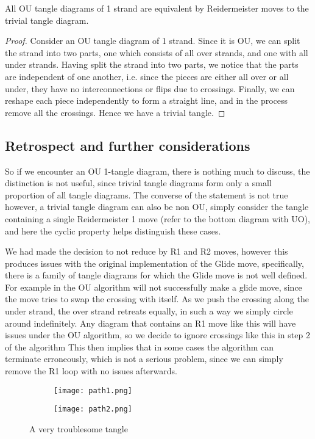 \begin{theorem}
All OU tangle diagrams of 1 strand are equivalent by Reidermeister moves to the trivial tangle diagram.
\end{theorem}

\begin{proof}
Consider an OU tangle diagram of 1 strand. Since it is OU, we can split the strand into two parts, one which consists of all over strands, and one with all under strands. Having split the strand into two parts, we notice that the parts are independent of one another, i.e. since the pieces are either all over or all under, they have no interconnections or flips due to crossings. Finally, we can reshape each piece independently to form a straight line, and in the process remove all the crossings. Hence we have a trivial tangle.
\end{proof}

\subsection{Retrospect and further considerations}

So if we encounter an OU 1-tangle diagram, there is nothing much to discuss, the distinction is not useful, since trivial tangle diagrams form only a small proportion of all tangle diagrams. The converse of the statement is not true however, a trivial tangle diagram can also be non OU, simply consider the tangle containing a single Reidermeister 1 move (refer to  the bottom  diagram with UO), and here the cyclic property helps distinguish these cases. 

We had made the decision to not reduce by R1 and R2 moves, however this produces issues with the original implementation of the Glide move, specifically, there is a family of tangle diagrams for which the Glide move is not well defined. For example in  the OU algorithm will not successfully make a glide move, since the move tries to swap the crossing with itself. As we push the crossing along the under strand, the over strand retreats equally, in such a way we simply circle around indefinitely. Any diagram that contains an R1 move like this will have issues under the OU algorithm, so we decide to ignore crossings like this in step 2 of the algorithm This then implies that in some cases the algorithm can terminate erroneously, which is not a serious problem, since we can simply remove the R1 loop with no issues afterwards.

\begin{figure}
\centering
\begin{subfigure}{0.49\textwidth}
\centering
\texttt{[image: path1.png]}
\end{subfigure}
\hfill
\begin{subfigure}{0.49\textwidth}
\centering
\texttt{[image: path2.png]}
\end{subfigure}
\caption{A very troublesome tangle}
\label{fig:pathology}
\end{figure}